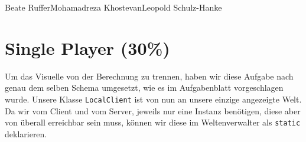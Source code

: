\documentclass{pi1}
\begin{document}
		{Beate Ruffer}{Mohamadreza Khostevan}{Leopold Schulz-Hanke}

\section{Single Player (30\%)}
Um das Visuelle von der Berechnung zu trennen, haben wir diese Aufgabe nach genau dem selben Schema umgesetzt, wie es im Aufgabenblatt vorgeschlagen wurde. Unsere Klasse \texttt{LocalClient} ist von nun an unsere einzige angezeigte Welt.\\
Da wir vom Client und vom Server, jeweils nur eine Instanz benötigen, diese aber von überall erreichbar sein muss, können wir diese im Weltenverwalter als \texttt{static} deklarieren.
\end{document}
